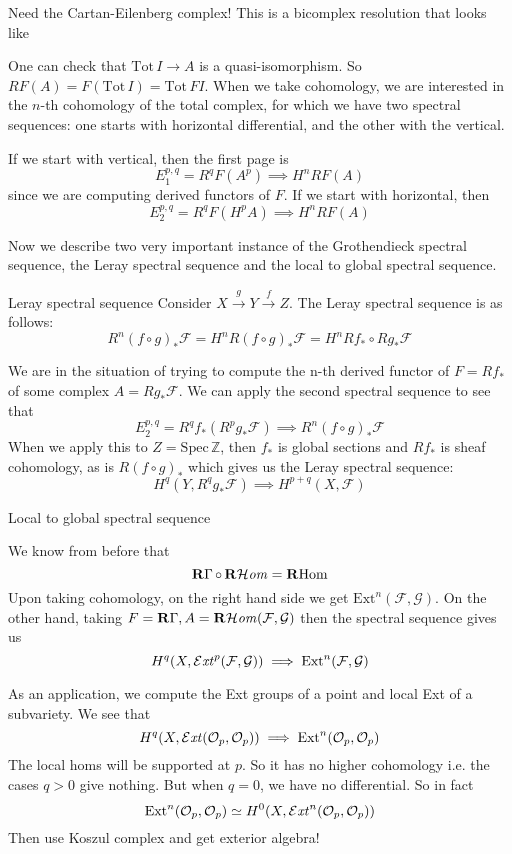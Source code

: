 Need the Cartan-Eilenberg complex! This is a bicomplex resolution that looks like %

One can check that $\mathrm{Tot}\,I \rightarrow A$ is a quasi-isomorphism. So $RF(A)=F(\mathrm{Tot}\,I)=\mathrm{Tot}\,FI$. When we take cohomology, we are interested in the $n$-th cohomology of the total complex, for which we have two spectral sequences: one starts with horizontal differential, and the other with the vertical. 

If we start with vertical, then the first page is $$E_{1}^{p,q}=R^qF(A^p)\implies H^nRF(A)$$since we are computing derived functors of $F$. If we start with horizontal, then $$E_{2}^{p,q}=R^qF(H^pA)\implies H^nRF(A)$$

Now we describe two very important instance of the Grothendieck spectral sequence, the Leray spectral sequence and the local to global spectral sequence.

\begin{example}{Leray spectral sequence}{} Consider $X\xrightarrow{g} Y \xrightarrow{f} Z$. The Leray spectral sequence is as follows: $$R^n(f\circ g)_{*}\mathcal{F}=H^nR(f\circ g)_{*}\mathcal{F}=H^n Rf_{*}\circ Rg_{*} \mathcal{F}$$

We are in the situation of trying to compute the n-th derived functor of $F=Rf_*$ of some complex $A=Rg_*\mathcal{F}$. We can apply the second spectral sequence to see that $$E_{2}^{p,q}=R^qf_{*}(R^pg_{*}\mathcal{F})\implies R^n(f\circ g)_{*} \mathcal{F}$$
When we apply this to $Z=\mathrm{Spec}\,\mathbb{Z}$, then $f_*$ is global sections and $Rf_*$ is sheaf cohomology, as is $R(f\circ g)_*$ which gives us the Leray spectral sequence: $$H^q(Y, R^qg_{*}\mathcal{F})\implies H^{p+q}(X,\mathcal{F})$$
\end{example}



\begin{example}{Local to global spectral sequence}{}

We know from before that $$\operatorname{\mathbf{R}\Gamma}\circ \operatorname{\mathbf{R}\mathcal{H}\mathit{om}}=\operatorname{\mathbf{R}Hom}$$
Upon taking cohomology, on the right hand side we get $\mathrm{Ext}^n(\mathcal{F}, \mathcal{G}).$ On the other hand, taking $F=\operatorname{\mathbf{R}\Gamma}, A=\operatorname{\mathbf{R}\mathcal{H}\mathit{om}}(\mathcal{ F}, \mathcal{G})$ then the spectral sequence gives us $$H^q(X, \operatorname{\mathcal{E}\mathit{xt}}^p(\mathcal{F, \mathcal{G))}}\implies \mathrm{Ext}^n(\mathcal{F},\mathcal{G)}$$ \end{example}

As an application, we compute the Ext groups of a point and local Ext of a subvariety. 
We see that $$H^q(X, \operatorname{\mathcal{E}\mathit{xt}}(\mathcal{O}_{p}, \mathcal{O}_{p}))\implies \mathrm{Ext}^n(\mathcal{O}_{p}, \mathcal{O}_{p})$$The local homs will be supported at $p$. So it has no higher cohomology i.e. the cases $q>0$ give nothing. But when $q=0$, we have no differential. So in fact $$\mathrm{Ext}^n(\mathcal{O}_{p}, \mathcal{O}_{p})\simeq H^0(X, \operatorname{\mathcal{E}\mathit{xt}}^n(\mathcal{O}_{p}, \mathcal{O}_{p}))$$Then use Koszul complex and get exterior algebra!

